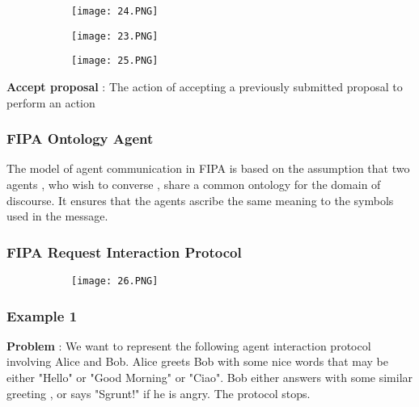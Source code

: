 \documentclass{article}
\begin{document}
\begin{figure}[ht!]
  \centering
  \begin{subfigure}[b]{0.5\linewidth}
    \texttt{[image: 24.PNG]}
  \end{subfigure}
     \begin{subfigure}[b]{0.49\textwidth}
         \centering
         \texttt{[image: 23.PNG]}
     \end{subfigure}
\end{figure}

\begin{figure}[ht!]
  \centering
  \begin{subfigure}[b]{0.6\linewidth}
    \texttt{[image: 25.PNG]}
  \end{subfigure}
\end{figure}

\textbf{Accept proposal} : The action of accepting a previously submitted proposal to perform an action

\subsubsection{FIPA Ontology Agent}

The model of agent communication in FIPA is based on the assumption that two agents , who wish to converse , share a common ontology for the domain of discourse.
It ensures that the agents ascribe the same meaning to the symbols used in the message.

\subsubsection{FIPA Request Interaction Protocol}

\begin{figure}[ht!]
  \centering
  \begin{subfigure}[b]{0.3\linewidth}
    \texttt{[image: 26.PNG]}
  \end{subfigure}
\end{figure}

\subsubsection{Example 1}

\textbf{Problem} : We want to represent the following agent interaction protocol involving Alice and Bob. Alice greets Bob with some nice words that may be either "Hello" or "Good Morning" or "Ciao". Bob either answers with some similar greeting , or says "Sgrunt!" if he is angry. The protocol stops.
\end{document}
